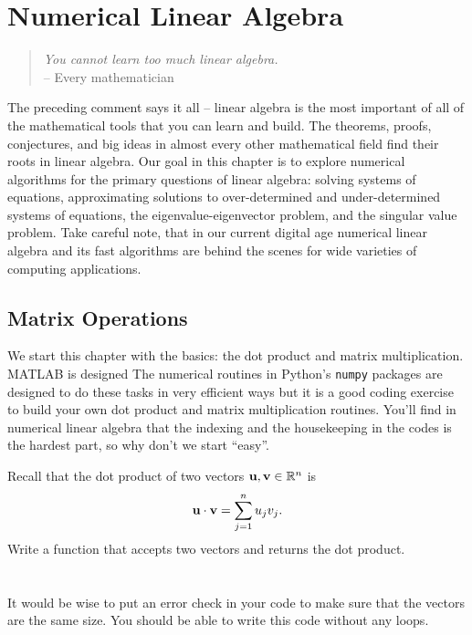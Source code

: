 \chapter{Numerical Linear Algebra}\label{ch:linear_algebra}
\begin{quote}
    {\it You cannot learn too much
    linear algebra.} \\ -- Every mathematician
\end{quote}

The preceding comment says it all -- linear algebra is the most important of all of the
mathematical tools that you can learn and build.  The theorems, proofs, conjectures, and
big ideas in almost every other mathematical field find their roots in linear algebra.
Our goal in this chapter is to explore numerical algorithms for the primary questions of
linear algebra: solving systems of equations, approximating solutions to over-determined
and under-determined systems of equations, the eigenvalue-eigenvector problem, and the
singular value problem. Take careful note, that in our current digital age numerical
linear algebra and its fast algorithms are behind the scenes for wide varieties of
computing applications. 


\section{Matrix Operations}
We start this chapter with the basics: the dot product and matrix multiplication.  
\ifnum{} 
MATLAB is designed 
\else
The numerical routines in Python's \texttt{numpy} packages are designed 
\fi
to do these tasks in very efficient ways but it is a good coding exercise to build your
own dot product and matrix multiplication routines.  You'll find in numerical linear
algebra that the indexing and the housekeeping in the codes is the hardest part, so why
don't we start ``easy''.

\begin{problem}
    Recall that the dot product of two vectors ${\bf u}, {\bf v} \in \mathbb{R}^n$ is 
    \[ {\bf u} \cdot {\bf v} = \sum_{j=1}^n u_j v_j. \]
    Write a \ProgLang function that accepts two vectors and returns the dot product. \\
    \ifnum{}
     \\
    \else
     \\
    \fi
    It would be wise to put an error check in your code to make sure that the vectors are
    the same size.  You should be able to write this code without any loops.
\end{problem}

